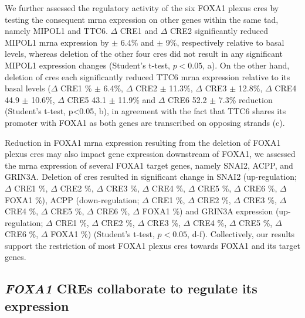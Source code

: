 We further assessed the regulatory activity of the six FOXA1 plexus \glspl{cre} by testing the consequent \gls{mrna} expression on other genes within the same \gls{tad}, namely MIPOL1 and TTC6.
$\Delta$ CRE1 and $\Delta$ CRE2 significantly reduced MIPOL1 \gls{mrna} expression by  $\pm$ 6.4\% and  $\pm$ 9\%, respectively relative to basal levels, whereas deletion of the other four \glspl{cre} did not result in any significant MIPOL1 expression changes (Student's t-test, $p<0.05$, a).
On the other hand, deletion of \glspl{cre} each significantly reduced TTC6 \gls{mrna} expression relative to its basal levels ($\Delta$ CRE1 \% $\pm$ 6.4\%, $\Delta$ CRE2  $\pm$ 11.3\%, $\Delta$ CRE3  $\pm$ 12.8\%, $\Delta$ CRE4 44.9 $\pm$ 10.6\%, $\Delta$ CRE5 43.1 $\pm$ 11.9\% and $\Delta$ CRE6 52.2 $\pm$ 7.3\% reduction (Student's t-test, p<0.05, b), in agreement with the fact that TTC6 shares its promoter with FOXA1 as both genes are transcribed on opposing strands (c).

Reduction in FOXA1 \gls{mrna} expression resulting from the deletion of FOXA1 plexus \glspl{cre} may also impact gene expression downstream of FOXA1, we assessed the \gls{mrna} expression of several FOXA1 target genes, namely SNAI2, ACPP, and GRIN3A.
Deletion of \glspl{cre} resulted in significant change in SNAI2 (up-regulation; $\Delta$ CRE1 \%, $\Delta$ CRE2 \%, $\Delta$ CRE3 \%, $\Delta$ CRE4 \%, $\Delta$ CRE5 \%, $\Delta$ CRE6 \%, $\Delta$ FOXA1 \%), ACPP (down-regulation; $\Delta$ CRE1 \%, $\Delta$ CRE2 \%, $\Delta$ CRE3 \%, $\Delta$ CRE4 \%, $\Delta$ CRE5 \%, $\Delta$ CRE6 \%, $\Delta$ FOXA1 \%) and GRIN3A expression (up-regulation; $\Delta$ CRE1 \%, $\Delta$ CRE2 \%, $\Delta$ CRE3 \%, $\Delta$ CRE4 \%, $\Delta$ CRE5 \%, $\Delta$ CRE6 \%, $\Delta$ FOXA1 \%) (Student's t-test, $p < 0.05$, d-f).
Collectively, our results support the restriction of most FOXA1 plexus \glspl{cre} towards FOXA1 and its target genes.

\subsection{\emph{FOXA1} CREs collaborate to regulate its expression}

